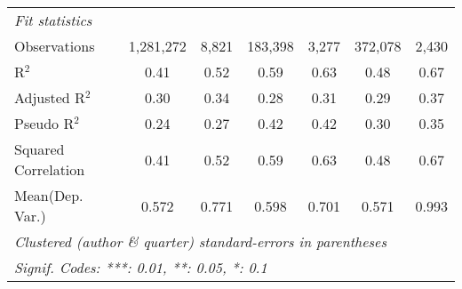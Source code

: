 \begin{tabular}{lcccccc}
   \midrule
   \emph{Fit statistics}\\
   Observations                                               & 1,281,272      & 8,821        & 183,398        & 3,277   & 372,078        & 2,430\\  
   R$^2$                                                      & 0.41           & 0.52         & 0.59           & 0.63    & 0.48           & 0.67\\  
   Adjusted R$^2$                                             & 0.30           & 0.34         & 0.28           & 0.31    & 0.29           & 0.37\\  
   Pseudo R$^2$                                               & 0.24           & 0.27         & 0.42           & 0.42    & 0.30           & 0.35\\  
   Squared Correlation                                        & 0.41           & 0.52         & 0.59           & 0.63    & 0.48           & 0.67\\  
Mean(Dep. Var.) & 0.572 & 0.771 & 0.598 & 0.701 & 0.571 & 0.993 \\
   \midrule \midrule
   \multicolumn{7}{l}{\emph{Clustered (author \& quarter) standard-errors in parentheses}}\\
   \multicolumn{7}{l}{\emph{Signif. Codes: ***: 0.01, **: 0.05, *: 0.1}}\\
\end{tabular}
\par\endgroup
